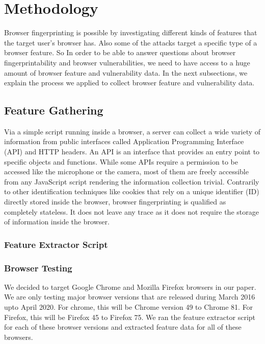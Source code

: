 \section{Methodology}
\label{sec:methodology}
Browser fingerprinting is possible by investigating different kinds of features that the target user's browser has. Also some of the attacks target a specific type of a browser feature. So In order to be able to answer questions about browser fingerprintability and browser vulnerabilities, we need to have access to a huge amount of browser feature and vulnerability data. In the next subsections, we explain the process
we applied to collect browser feature and vulnerability data.


\subsection{Feature Gathering}


Via a simple script running inside a browser, a server can collect a wide variety of information from
public interfaces called Application Programming Interface (API) and HTTP headers. An API
is an interface that provides an entry point to specific objects and functions. While some APIs
require a permission to be accessed like the microphone or the camera, most of them are freely
accessible from any JavaScript script rendering the information collection trivial. Contrarily to
other identification techniques like cookies that rely on a unique identifier (ID) directly stored
inside the browser, browser fingerprinting is qualified as completely stateless. It does not leave any
trace as it does not require the storage of information inside the browser.


\subsubsection{Feature Extractor Script}



\subsubsection{Browser Testing}

We decided to target Google Chrome and Mozilla Firefox browsers in our paper. We are only testing major browser versions that are released during March 2016 upto April 2020. For chrome, this will be Chrome version 49 to Chrome 81. For Firefox, this will be Firefox 45 to Firefox 75.
We ran the feature extractor script for each of these browser versions and extracted feature data for all of these browsers.

